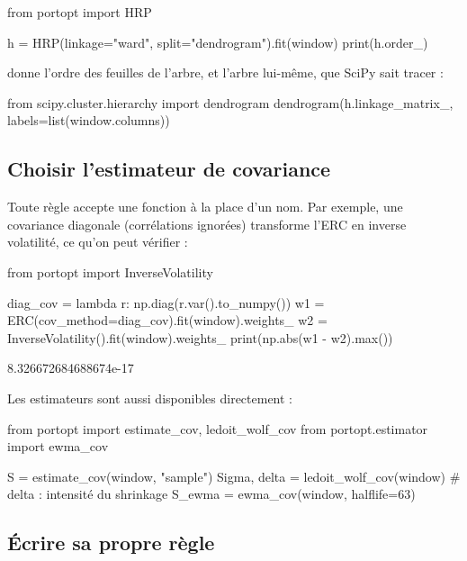 \documentclass[11pt,a4paper]{article}
\newcommand{\py}[1]{{\ttfamily\hyphenchar\font=-1 \detokenize{#1}}}
\begin{document}
\begin{python}
from portopt import HRP

h = HRP(linkage="ward", split="dendrogram").fit(window)
print(h.order_)
\end{python}
\begin{pyout}
\end{pyout}

\py{order_} donne l'ordre des feuilles de l'arbre, et \py{linkage_matrix_} l'arbre
lui-même, que SciPy sait tracer :

\begin{python}
from scipy.cluster.hierarchy import dendrogram
dendrogram(h.linkage_matrix_, labels=list(window.columns))
\end{python}

\subsection{Choisir l'estimateur de covariance}

Toute règle accepte une fonction à la place d'un nom. Par exemple, une covariance
diagonale (corrélations ignorées) transforme l'ERC en inverse volatilité, ce qu'on peut
vérifier :

\begin{python}
from portopt import InverseVolatility

diag_cov = lambda r: np.diag(r.var().to_numpy())
w1 = ERC(cov_method=diag_cov).fit(window).weights_
w2 = InverseVolatility().fit(window).weights_
print(np.abs(w1 - w2).max())
\end{python}
\begin{pyout}
8.326672684688674e-17
\end{pyout}

Les estimateurs sont aussi disponibles directement :

\begin{python}
from portopt import estimate_cov, ledoit_wolf_cov
from portopt.estimator import ewma_cov

S = estimate_cov(window, "sample")
Sigma, delta = ledoit_wolf_cov(window)       # delta : intensité du shrinkage
S_ewma = ewma_cov(window, halflife=63)
\end{python}

\subsection{Écrire sa propre règle}
\end{document}
